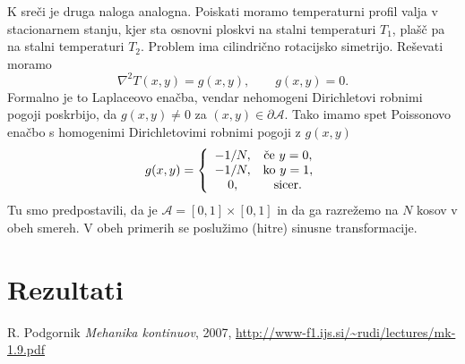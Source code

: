 \documentclass[a4 paper, 12pt]{article}
\begin{document}
K sre\v ci je druga naloga analogna. Poiskati moramo temperaturni profil valja v stacionarnem stanju,
kjer sta osnovni ploskvi na stalni temperaturi $T_1$, pla\v s\v c pa na stalni temperaturi $T_2$. Problem
ima cilindri\v cno rotacijsko simetrijo. Re\v sevati moramo
\[
	\nabla^2 T (x,y) = g(x,y), \qquad g(x,y) = 0.
\]
Formalno je to Laplaceovo ena\v cba, vendar nehomogeni Dirichletovi robnimi pogoji poskrbijo, da
$g(x,y) \neq 0$ za $(x,y) \in \partial \mathcal{A}$. Tako imamo spet Poissonovo ena\v cbo s homogenimi
Dirichletovimi robnimi pogoji z $g (x,y)$
\[
	g(x,y) = \left\{\begin{array}{c c}
			-1/N, & \text{\v ce\ } y = 0, \\
			-1/N, & \text{ko\ } y = 1, \\
			0, & \text{sicer.}
		\end{array}
		\right.
\]
Tu smo predpostavili, da je $\mathcal{A} = [0,1] \times [0,1]$ in da ga razre\v zemo na $N$ kosov
v obeh smereh. V obeh primerih se poslu\v zimo (hitre) sinusne transformacije.

\section{Rezultati}

\begin{thebibliography}{9}
		R. Podgornik
		{\em Mehanika kontinuov},
		2007,
		\url{http://www-f1.ijs.si/~rudi/lectures/mk-1.9.pdf}
\end{thebibliography}
\end{document}
